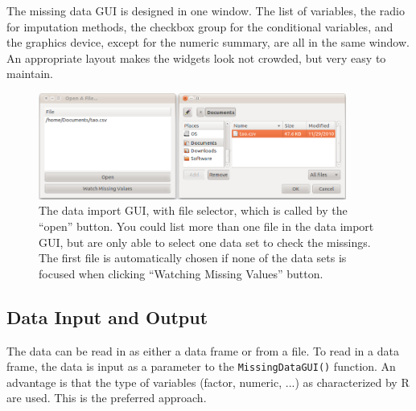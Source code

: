 \documentclass[article]{jss}
\begin{document}

The missing data GUI is designed in one window. The list of variables, the radio for imputation methods, the checkbox group for the conditional variables, and the graphics device, except for the numeric summary, are all in the same window. An appropriate layout makes the widgets look not crowded, but very easy to maintain. 

\begin{center}
%
\begin{figure}[h]
\begin{centering}
\includegraphics[width=0.9\textwidth]{Miss_fig6}
\par\end{centering}

\caption{\label{fig: import}{The data import GUI, with file selector, which is called by the ``open'' button. You could list more than one file in the data import GUI, but are only able to select one data set to check the missings. The first file is automatically chosen if none of the data sets is focused when clicking ``Watching Missing Values'' button. }}

\end{figure}

\par\end{center}

\subsection{Data Input and Output}

The data can be read in as either a data frame or from a file. To read in a data frame, the data is input as a parameter to the \texttt{MissingDataGUI()} function.  An advantage is that the type of variables (factor, numeric, ...) as characterized by R are used. This is the preferred approach.
\end{document}
